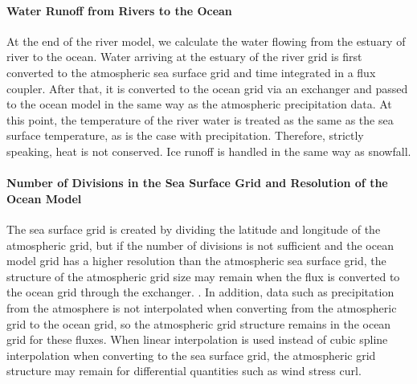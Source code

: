 \hypertarget{water-runoff-from-rivers-to-the-ocean}{%
\paragraph{Water Runoff from Rivers to the
Ocean}\label{water-runoff-from-rivers-to-the-ocean}}

At the end of the river model, we calculate the water flowing from the
estuary of river to the ocean. Water arriving at the estuary of the
river grid is first converted to the atmospheric sea surface grid and
time integrated in a flux coupler. After that, it is converted to the
ocean grid via an exchanger and passed to the ocean model in the same
way as the atmospheric precipitation data. At this point, the
temperature of the river water is treated as the same as the sea surface
temperature, as is the case with precipitation. Therefore, strictly
speaking, heat is not conserved. Ice runoff is handled in the same way
as snowfall.

\hypertarget{number-of-divisions-in-the-sea-surface-grid-and-resolution-of-the-ocean-model}{%
\paragraph{Number of Divisions in the Sea Surface Grid and Resolution of
the Ocean
Model}\label{number-of-divisions-in-the-sea-surface-grid-and-resolution-of-the-ocean-model}}

The sea surface grid is created by dividing the latitude and longitude
of the atmospheric grid, but if the number of divisions is not
sufficient and the ocean model grid has a higher resolution than the
atmospheric sea surface grid, the structure of the atmospheric grid size
may remain when the flux is converted to the ocean grid through the
exchanger. . In addition, data such as precipitation from the atmosphere
is not interpolated when converting from the atmospheric grid to the
ocean grid, so the atmospheric grid structure remains in the ocean grid
for these fluxes. When linear interpolation is used instead of cubic
spline interpolation when converting to the sea surface grid, the
atmospheric grid structure may remain for differential quantities such
as wind stress curl.
